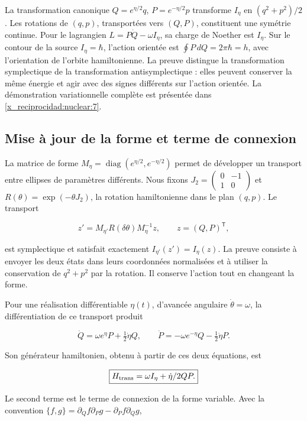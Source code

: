 La transformation canonique \(Q=e^{\eta/2}q\), \(P=e^{-\eta/2}p\) transforme \(I_\eta\) en \((q^2+p^2)/2\). Les rotations de \((q,p)\), transportées vers \((Q,P)\), constituent une symétrie continue. Pour le lagrangien \(L=P\dot Q-\omega I_\eta\), sa charge de Noether est \(I_\eta\). Sur le contour de la source \(I_\eta=\hbar\), l’action orientée est \(\oint P\,dQ=2\pi\hbar=h\), avec l’orientation de l’orbite hamiltonienne. La preuve distingue la transformation symplectique de la transformation antisymplectique : elles peuvent conserver la même énergie et agir avec des signes différents sur l’action orientée. La démonstration variationnelle complète est présentée dans \cref{x_reciprocidad:nuclear:7}.

\subsection{Mise à jour de la forme et terme de connexion}

La matrice de forme \(M_\eta=\operatorname{diag}(e^{\eta/2},e^{-\eta/2})\) permet de développer un transport entre ellipses de paramètres différents. Nous fixons \(J_2=\begin{pmatrix}0&-1\\1&0\end{pmatrix}\) et \(R(\theta)=\exp(-\theta J_2)\), la rotation hamiltonienne dans le plan \((q,p)\). Le transport

\[
z'=M_{\eta'}R(\delta\theta)M_\eta^{-1}z,
\qquad z=(Q,P)^\mathsf T,
\]

est symplectique et satisfait exactement \(I_{\eta'}(z')=I_\eta(z)\). La preuve consiste à envoyer les deux états dans leurs coordonnées normalisées et à utiliser la conservation de \(q^2+p^2\) par la rotation. Il conserve l’action tout en changeant la forme.

Pour une réalisation différentiable \(\eta(t)\), d’avancée angulaire \(\dot\theta=\omega\), la différentiation de ce transport produit

\[
\dot Q=\omega e^\eta P+\tfrac12\dot\eta Q,\qquad
\dot P=-\omega e^{-\eta}Q-\tfrac12\dot\eta P.
\]

Son générateur hamiltonien, obtenu à partir de ces deux équations, est

\begin{equation}
\boxed{H_{\rm trans}=\omega I_\eta+\frac{\dot\eta}{2}QP.}\label{x_reciprocidad:nuc02:eq:7}
\end{equation}

Le second terme est le terme de connexion de la forme variable. Avec la convention \(\{f,g\}=\partial_Qf\partial_Pg-\partial_Pf\partial_Qg\),

